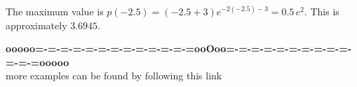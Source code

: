 \documentclass{ximera}
\begin{document}
The maximum value is $p(-2.5) = (-2.5+3)e^{-2(-2.5)-3} = 0.5 \, e^{2}$.  This is approximately $3.6945$.


































\begin{center}
\textbf{\textcolor{green!50!black}{ooooo=-=-=-=-=-=-=-=-=-=-=-=-=ooOoo=-=-=-=-=-=-=-=-=-=-=-=-=ooooo}} \\

more examples can be found by following this link\\ 

\end{center}
\end{document}
